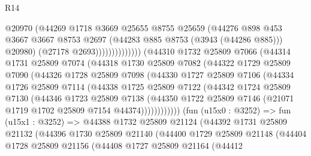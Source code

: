 \begin{lexlean}{R14}
\begin{coremodule}
                                @20970
                                (@44269
                                  @1718
                                  @3669
                                  @25655
                                  @8755
                                  @25659
                                  (@44276
                                    @898
                                    @453
                                    @3667
                                    @3667
                                    @8753
                                    @2697
                                    (@44283 @885 @8753 (@3943 (@44286 @885)))
                                    @20980)
                                  (@27178 @2693))))))))))))))
        (@44310
          @1732
          @25809
          @7066
          (@44314
            @1731
            @25809
            @7074
            (@44318
              @1730
              @25809
              @7082
              (@44322
                @1729
                @25809
                @7090
                (@44326
                  @1728
                  @25809
                  @7098
                  (@44330
                    @1727
                    @25809
                    @7106
                    (@44334
                      @1726
                      @25809
                      @7114
                      (@44338
                        @1725
                        @25809
                        @7122
                        (@44342
                          @1724
                          @25809
                          @7130
                          (@44346
                            @1723
                            @25809
                            @7138
                            (@44350
                              @1722
                              @25809
                              @7146
                              (@21071 @1719 @1702 @25809 @7154 @44374))))))))))))
        (fun (u15x0 : @3252) =>
        fun (u15x1 : @3252) =>
        @44388
          @1732
          @25809
          @21124
          (@44392
            @1731
            @25809
            @21132
            (@44396
              @1730
              @25809
              @21140
              (@44400
                @1729
                @25809
                @21148
                (@44404
                  @1728
                  @25809
                  @21156
                  (@44408
                    @1727
                    @25809
                    @21164
                    (@44412

\end{coremodule}
\end{lexlean}
